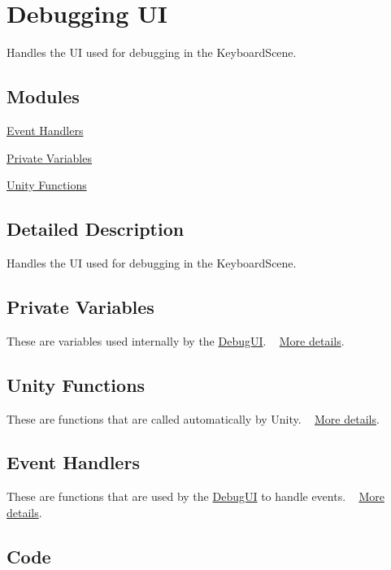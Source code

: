 \hypertarget{group___doc_deb_u_i}{}\section{Debugging UI}
\label{group___doc_deb_u_i}


Handles the UI used for debugging in the Keyboard\+Scene.  


\subsection*{Modules}
\begin{DoxyCompactItemize}
\item 
\hyperlink{group___deb_u_i_handlers}{Event Handlers}
\item 
\hyperlink{group___deb_u_i_priv_var}{Private Variables}
\item 
\hyperlink{group___deb_u_i_unity}{Unity Functions}
\end{DoxyCompactItemize}


\subsection{Detailed Description}
Handles the UI used for debugging in the Keyboard\+Scene. 

\hypertarget{group___doc_deb_u_i_DocDebUIPrivVar}{}\subsection{Private Variables}\label{group___doc_deb_u_i_DocDebUIPrivVar}
These are variables used internally by the \hyperlink{class_debug_u_i}{Debug\+UI}. ~\newline
 \hyperlink{group___deb_u_i_priv_var}{More details}.\hypertarget{group___doc_deb_u_i_DocDebUIUnity}{}\subsection{Unity Functions}\label{group___doc_deb_u_i_DocDebUIUnity}
These are functions that are called automatically by Unity. ~\newline
 \hyperlink{group___deb_u_i_unity}{More details}.\hypertarget{group___doc_deb_u_i_DocDebUIHandlers}{}\subsection{Event Handlers}\label{group___doc_deb_u_i_DocDebUIHandlers}
These are functions that are used by the \hyperlink{class_debug_u_i}{Debug\+UI} to handle events. ~\newline
 \hyperlink{group___deb_u_i_handlers}{More details}.\hypertarget{group___doc_deb_u_i_DocDebUICode}{}\subsection{Code}\label{group___doc_deb_u_i_DocDebUICode}


